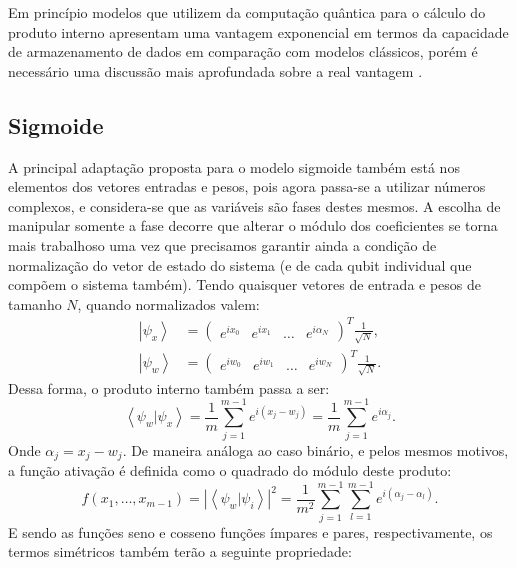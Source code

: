 Em princípio modelos que utilizem da computação quântica para o cálculo do produto interno apresentam uma vantagem exponencial em termos da capacidade de armazenamento de dados em comparação com modelos clássicos, porém é necessário uma discussão mais aprofundada sobre a real vantagem \cite{Italiano}.

 \subsection{Sigmoide}

A principal adaptação proposta para o modelo sigmoide também está nos elementos dos vetores entradas e pesos,  pois agora passa-se a utilizar números complexos, e considera-se que as variáveis são fases destes mesmos. A escolha de manipular somente a fase decorre que alterar o módulo dos coeficientes se torna mais trabalhoso uma vez que precisamos garantir ainda a condição de normalização do vetor de estado do sistema (e de cada qubit individual que compõem o sistema também).   Tendo quaisquer vetores de entrada e pesos de tamanho $N$, quando normalizados valem:
\begin{equation}
\begin{split}
\left|\psi_{x}\right\rangle & =\left(\begin{array}{cccc}
e^{ix_{0}} & e^{ix_{1}} & \ldots & e^{i\alpha_{N}}\end{array}\right)^{T}\frac{1}{\sqrt{N}},
\\
\left|\psi_{w}\right\rangle & =  \left(\begin{array}{cccc}
e^{iw_{0}} & e^{iw_{1}} & \ldots & e^{iw_{N}}\end{array}\right)^{T}\frac{1}{\sqrt{N}}.
\end{split}
\end{equation}
Dessa forma, o produto interno também passa a ser:
\begin{equation}
\left\langle \psi_{w}|\psi_{x}\right\rangle =\frac{1}{m}\sum_{j=1}^{m-1}e^{i\left(x_{j}-w_{j}\right)}=\frac{1}{m}\sum_{j=1}^{m-1}e^{i\alpha_{j}}
. \end{equation}
Onde $\alpha_{j}=x_{j}-w_{j}$. De maneira análoga ao caso binário, e pelos mesmos motivos, a função ativação é definida como o quadrado do módulo deste produto:
$$f\left(x_{1},\dots,x_{m-1}\right)=\left|\left\langle \psi_{w}|\psi_{i}\right\rangle \right|^{2}=\frac{1}{m^{2}}\sum_{j=1}^{m-1}\sum_{l=1}^{m-1}e^{i\left(\alpha_{j}-\alpha_{l}\right)}.$$
E sendo as funções seno  e cosseno funções ímpares e pares, respectivamente, os termos simétricos também terão a seguinte propriedade:
